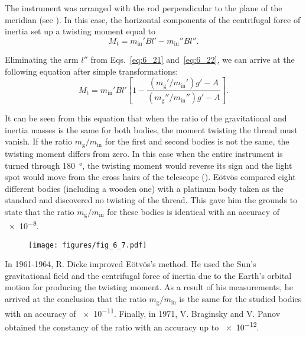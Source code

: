 \noindent
The instrument was arranged with the rod perpendicular to the plane of the meridian (see ). In this case, the horizontal components of the centrifugal force of inertia set up a twisting moment equal to
\begin{equation}\label{eq:6_22}
	M_{\text{t}} = m_{\text{in}}'Bl' - m_{\text{in}}''Bl''.
\end{equation}

\noindent
Eliminating the arm $l''$ from Eqs.~\eqref{eq:6_21} and~\eqref{eq:6_22}, we can arrive at the following equation after simple transformations:
\begin{equation*}
	M_{\text{t}} = m_{\text{in}}'Bl' \left[1 - \frac{(m_{\text{g}}'/m_{\text{in}}') g' - A}{(m_{\text{g}}''/m_{\text{in}}'') g' - A} \right].
\end{equation*}

\noindent
It can be seen from this equation that when the ratio of the gravitational and inertia masses is the same for both bodies, the moment twisting the thread must vanish. If the ratio $m_{\text{g}}/m_{\text{in}}$ for the first and second bodies is not the same, the twisting moment differs from zero. In this case when the entire instrument is turned through \SI{180}{\degree}, the twisting moment would reverse its sign and the light spot would move from the cross hairs of the telescope (). E\"{o}tv\"{o}s compared eight different bodies (including a wooden one) with a platinum body taken as the standard and discovered no twisting of the thread. This gave him the grounds to state that the ratio $m_{\text{g}}/m_{\text{in}}$ for these bodies is identical with an accuracy of \num{e-8}.

\begin{figure}[t]
	\begin{center}
		\texttt{[image: figures/fig\_6\_7.pdf]}
		\caption[]{}
		\label{fig:6_7}
	\end{center}
	\vspace{-0.7cm}
\end{figure}

In 1961-1964, R. Dicke improved E\"{o}tv\"{o}s's method. He used the Sun's gravitational field and the centrifugal force of inertia due to the Earth's orbital motion for producing the twisting moment. As a result of his measurements, he arrived at the conclusion that the ratio $m_{\text{g}}/m_{\text{in}}$ is the same for the studied bodies with an accuracy of \num{e-11}. Finally, in 1971, V. Braginsky and V. Panov obtained the constancy of the ratio with an accuracy up to \num{e-12}.

